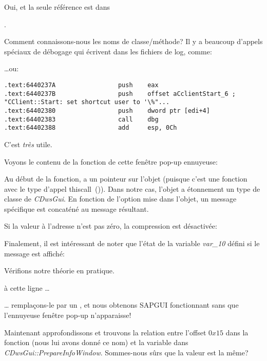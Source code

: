 Oui, et la seule référence est dans
\par {}.

Comment connaissons-nous les noms de classe/méthode? Il y a beaucoup d'appels spéciaux
de débogage qui écrivent dans les fichiers de log, comme:



\dots ou:

\begin{lstlisting}[style=customasmx86]
.text:6440237A                 push    eax
.text:6440237B                 push    offset aCclientStart_6 ; "CClient::Start: set shortcut user to '\%"...
.text:64402380                 push    dword ptr [edi+4]
.text:64402383                 call    dbg
.text:64402388                 add     esp, 0Ch
\end{lstlisting}

C'est \emph{très} utile.

Voyons le contenu de la fonction de cette fenêtre pop-up ennuyeuse:



Au début de la fonction, \ECX a un pointeur sur l'objet (puisque c'est une fonction
avec le type d'appel thiscall~()).
Dans notre cas, l'objet a étonnement un type de classe de \emph{CDwsGui}.
En fonction de l'option mise dans l'objet, un message spécifique est concaténé au
message résultant.

Si la valeur à l'adresse  n'est pas zéro, la compression est désactivée:



Finalement, il est intéressant de noter que l'état de la variable \emph{var\_10}
défini si le message est affiché:



Vérifions notre théorie en pratique.

\JNZ à cette ligne \dots



\dots 
remplaçons-le par un \JMP, et nous obtenons SAPGUI fonctionnant sans que l'ennuyeuse
fenêtre pop-up n'apparaisse!

Maintenant approfondissons et trouvons la relation entre l'offset $0x15$ dans la
fonction  (nous lui avons donné ce nom) et la variable
 dans \emph{CDwsGui::PrepareInfoWindow}.
Sommes-nous sûrs que la valeur est la même?

